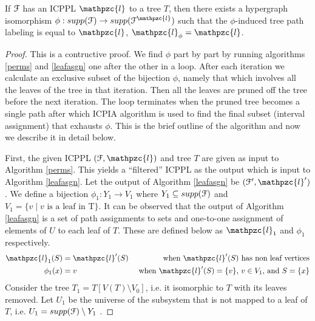 \documentclass[a4paper,UKenglish,numberwithinsect]{lipics} %
\def\cF{{\cal F}}
\def\cl{\mathpzc{l}}
\def\lndisplay{1}
\begin{document}
\begin{theorem}
\label{th:perm}
  If $\cF$ has an ICPPL $\cl$ to a tree $T$, then there exists a hypergraph
  isomorphism $\phi : supp(\cF) \rightarrow supp(\cF^\cl)$ such that
  the $\phi$-induced tree path labeling is equal to $\cl$, $\cl_\phi = \cl$.
\end{theorem}
\begin{proof} 
This is a contructive proof. We find $\phi$ part by part by
running algorithms \ref{perms} and \ref{leafasgn} one after the other
in a loop. After each iteration we calculate an exclusive subset of
the bijection $\phi$, namely that which involves all the leaves of the
tree in that iteration. Then all the leaves are pruned off the tree
before the next iteration. The loop terminates when the pruned tree
becomes a single path after which ICPIA algorithm is used to find the
final subset (interval assignment) that exhausts $\phi$. This is
the brief outline of the algorithm and now we describe it in detail
below.
  

\noindent
First, the given ICPPL $(\cF, \cl)$ and tree $T$ are given as input to
Algorithm \ref{perms}. This yields a ``filtered'' ICPPL as the output
which is input to Algorithm \ref{leafasgn}.  Let the output of
Algorithm \ref{leafasgn} be $(\cF',\cl')$. We define a bijection
$\phi_1: Y_1 \rightarrow V_1$ where $Y_1 \subseteq supp(\cF)$ and $V_1
= \{v \mid v \text{ is a leaf in } $T$\}$.  It can be observed that
the output of Algorithm \ref{leafasgn} is a set of path assignments to
sets and one-to-one assignment of elements of $U$ to each leaf of
$T$. These are defined below as $\cl_1$ and $\phi_1$ respectively.
\vspace{-3mm}
\begin{align*}
  \cl_1(S) &= \cl'(S) &\text{ when $\cl'(S)$ has non leaf vertices} \\
  \phi_1(x) &= v  &\text{ when $\cl'(S) = \{v\}$, $v \in V_1$, and }
  S = \{x\}
\end{align*}
Consider the tree $T_1 = T[V(T) \setminus
V_0]$, i.e. it isomorphic to $T$ with its leaves removed. Let $U_1$ be the
universe of the subsystem that is not mapped to a leaf of $T$, i.e. $U_1 =
supp(\cF) \setminus Y_1$ .


\end{proof}
\end{document}
